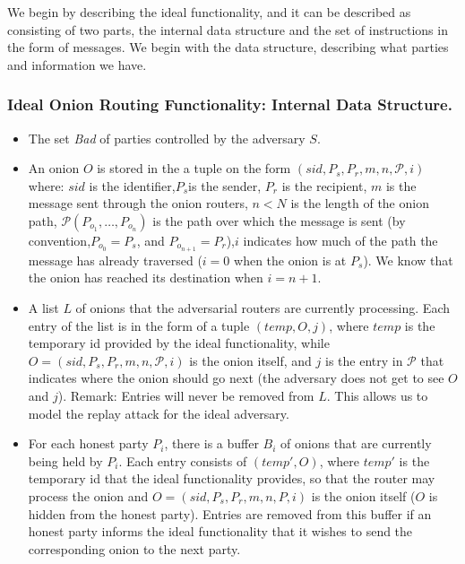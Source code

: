 We begin by describing the ideal functionality, and it can be
described as consisting of two parts, the internal data structure and
the set of instructions in the form of messages. We begin with the
data structure, describing what parties and information we have.

\subsubsection*{Ideal Onion Routing Functionality: Internal Data Structure.}
\begin{itemize}
\item{The set {\it Bad\/} of  parties controlled by the adversary \(S\).}
  
\item{An onion \(O\) is stored in the a tuple on the form \((sid, P_s,
  P_r, m, n, \mathcal{P}, i)\) where: \(sid\) is the
  identifier,\(P_s\)is the sender, \(P_r\) is the recipient, \(m\) is
  the message sent through the onion routers, \(n < N\) is the length
  of the onion path, \(\mathcal{P} (P_{o_1},\ldots, P_{o_n})\) is the
  path over which the message is sent (by convention,\(P_{o_0}=P_s\),
  and \(P_{o_{n+1}}=P_r\)),\(i\) indicates how much of the path the
  message has already traversed (\(i= 0\) when the onion is at
  \(P_s\)). We know that the onion has reached its destination when
  \(i=n+ 1\).
}
    
\item{ A list \(L\) of onions that the adversarial routers are
  currently processing. Each entry of the list is in the form of a
  tuple \((temp, O, j)\), where \(temp\) is the temporary id provided
  by the ideal functionality, while \(O= (sid, P_s, P_r, m, n,
  \mathcal{P}, i) \) is the onion itself, and \(j\) is the entry in
  \(\mathcal{P}\) that indicates where the onion should go next (the
  adversary does not get to see \(O\)and \(j\)). Remark: Entries will
  never be removed from \(L\). This allows us to model the replay
  attack for the ideal adversary.
}
      
\item{ For each honest party \(P_i\), there is a buffer \(B_i\) of
  onions that are currently being held by \(P_i\). Each entry consists
  of \((temp', O)\), where \(temp'\) is the temporary id that the
  ideal functionality provides, so that the router may process the
  onion and \(O = (sid, P_s, P_r, m, n, P, i)\) is the onion itself
  (\(O\) is hidden from the honest party). Entries are removed from
  this buffer if an honest party informs the ideal functionality that
  it wishes to send the corresponding onion to the next party.
}

\end{itemize}

